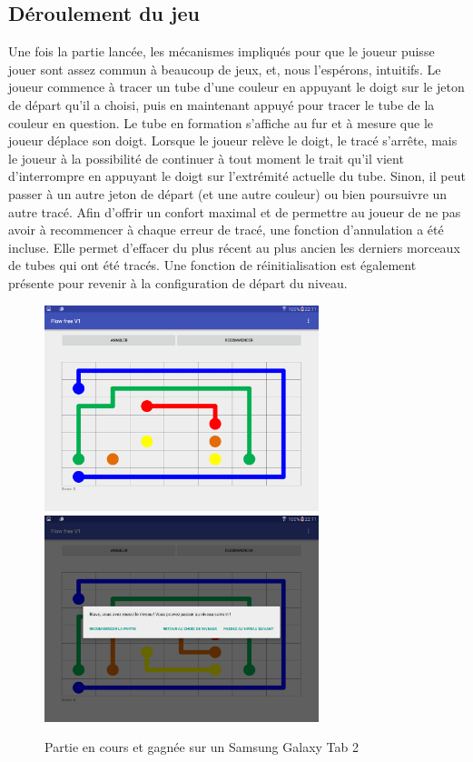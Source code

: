 \documentclass[12pt, a4paper]{article}%
\begin{document}
	\subsection{Déroulement du jeu}
	Une fois la partie lancée, les mécanismes impliqués pour que le joueur puisse jouer sont assez commun à beaucoup de jeux, et, nous l'espérons, intuitifs. Le joueur commence à tracer un tube d'une couleur en appuyant le doigt sur le jeton de départ qu'il a choisi, puis en maintenant appuyé pour tracer le tube de la couleur en question. Le tube en formation s'affiche au fur et à mesure que le joueur déplace son doigt. Lorsque le joueur relève le doigt, le tracé s'arrête, mais le joueur à la possibilité de continuer à tout moment le trait qu'il vient d'interrompre en appuyant le doigt sur l'extrémité actuelle du tube. Sinon, il peut passer à un autre jeton de départ (et une autre couleur) ou bien poursuivre un autre tracé.
	\newline
	Afin d'offrir un confort maximal et de permettre au joueur de ne pas avoir à recommencer à chaque erreur de tracé, une fonction d'annulation a été incluse. Elle permet d'effacer du plus récent au plus ancien les derniers morceaux de tubes qui ont été tracés. Une fonction de réinitialisation est également présente pour revenir à la configuration de départ du niveau.
	
	\begin{figure}
\includegraphics[width=8cm]{Images/s2_3.png}\hfill
\includegraphics[width=8cm]{Images/s2_4.png}
\caption{Partie en cours et gagnée sur un Samsung Galaxy Tab 2}\label{fig:partie}
\end{figure}
	
\end{document}
